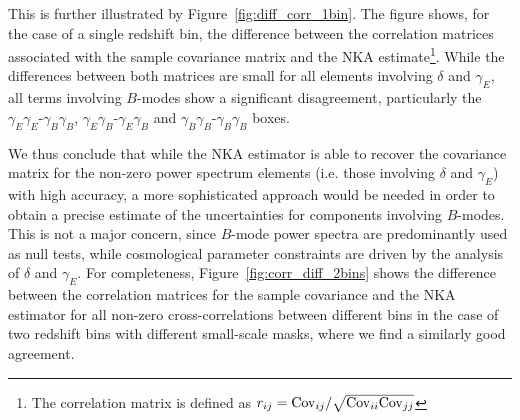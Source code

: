 \documentclass[a4paper,11pt]{article}
\begin{document}
      This is further illustrated by Figure~\ref{fig:diff_corr_1bin}. The figure shows, for the case of a single redshift bin, the difference between the correlation matrices associated with the sample covariance matrix and the NKA estimate\footnote{The correlation matrix is defined as $r_{ij} = {\rm Cov}_{ij}/\sqrt{{\rm Cov}_{ii}{\rm Cov}_{jj}}$}. While the differences between both matrices are small for all elements involving $\delta$ and $\gamma_E$, all terms involving $B$-modes show a significant disagreement, particularly the  $\gamma_E\gamma_E$-$\gamma_B\gamma_B$, $\gamma_E\gamma_B$-$\gamma_E\gamma_B$ and $\gamma_B\gamma_B$-$\gamma_B\gamma_B$ boxes.

      We thus conclude that while the NKA estimator is able to recover the covariance matrix for the non-zero power spectrum elements (i.e. those involving $\delta$ and $\gamma_E$) with high accuracy, a more sophisticated approach would be needed in order to obtain a precise estimate of the uncertainties for components involving $B$-modes. This is not a major concern, since $B$-mode power spectra are predominantly used as null tests, while cosmological parameter constraints are driven by the analysis of $\delta$ and $\gamma_E$. For completeness, Figure~\ref{fig:corr_diff_2bins} shows the difference between the correlation matrices for the sample covariance and the NKA estimator for all non-zero cross-correlations between different bins in the case of two redshift bins with different small-scale masks, where we find a similarly good agreement.
\end{document}

